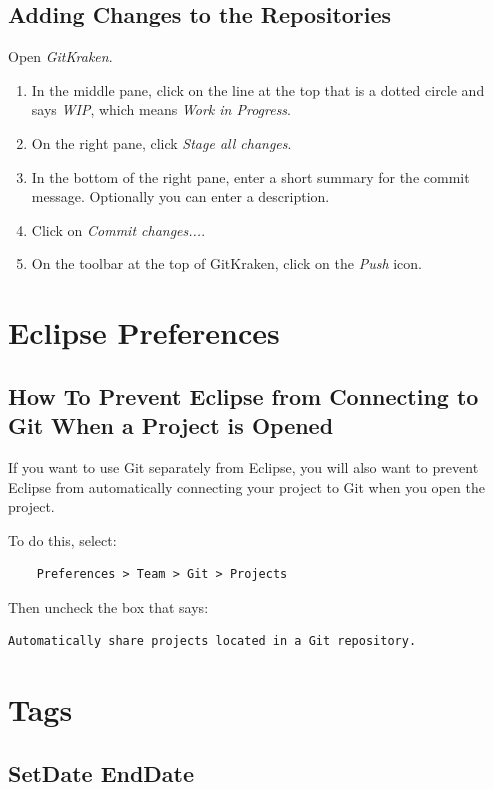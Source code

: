 \documentclass[]{memoir}
\begin{document}
\section{Adding Changes to the Repositories}

Open \emph{GitKraken}.

\begin{enumerate}
    \item In the middle pane, click on the line at the top that is a dotted circle and says \emph{WIP}, which means \emph{Work in Progress}.
    \item On the right pane, click \emph{Stage all changes}.
    \item In the bottom of the right pane, enter a short summary for the commit message.  Optionally you can enter a description.
    \item Click on \emph{Commit changes...}.
    \item On the toolbar at the top of GitKraken, click on the \emph{Push} icon.
\end{enumerate}

\chapter{Eclipse Preferences}
\section{How To Prevent Eclipse from Connecting to Git When a Project is Opened}

If you want to use Git separately from Eclipse, you will also want to prevent Eclipse from automatically connecting your project to Git when you open the project.

To do this, select:

\begin{verbatim}
    Preferences > Team > Git > Projects
\end{verbatim}

Then uncheck the box that says:

\begin{verbatim}
Automatically share projects located in a Git repository.    
\end{verbatim}
\chapter{Tags}

\section{Set\textunderscore Date End\textunderscore Date}
\end{document}

